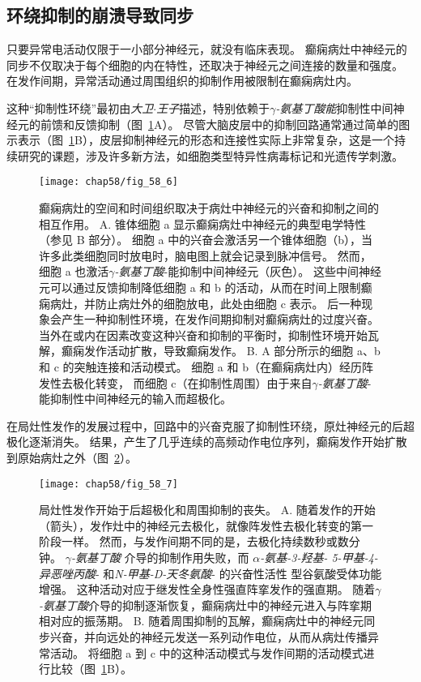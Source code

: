 \subsection{环绕抑制的崩溃导致同步}

只要异常电活动仅限于一小部分神经元，就没有临床表现。
癫痫病灶中神经元的同步不仅取决于每个细胞的内在特性，还取决于神经元之间连接的数量和强度。
在发作间期，异常活动通过周围组织的抑制作用被限制在癫痫病灶内。


这种“抑制性环绕”最初由\textit{大卫$\cdot$王子}描述，特别依赖于\textit{$\gamma$-氨基丁酸能}抑制性中间神经元的前馈和反馈抑制（图~\ref{fig:58_6}A）。
尽管大脑皮层中的抑制回路通常通过简单的图示表示（图~\ref{fig:58_6}B），皮层抑制神经元的形态和连接性实际上非常复杂，这是一个持续研究的课题，涉及许多新方法，如细胞类型特异性病毒标记和光遗传学刺激。


\begin{figure}[htbp]
	\centering
	\texttt{[image: chap58/fig\_58\_6]}
	\caption{癫痫病灶的空间和时间组织取决于病灶中神经元的兴奋和抑制之间的相互作用。
		A. 锥体细胞 a 显示癫痫病灶中神经元的典型电学特性（参见 B 部分）。
		细胞 a 中的兴奋会激活另一个锥体细胞（b），当许多此类细胞同时放电时，脑电图上就会记录到脉冲信号。
		然而，细胞 a 也激活\textit{$\gamma$-氨基丁酸}-能抑制中间神经元（灰色）。
		这些中间神经元可以通过反馈抑制降低细胞 a 和 b 的活动，从而在时间上限制癫痫病灶，并防止病灶外的细胞放电，此处由细胞 c 表示。
		后一种现象会产生一种抑制性环境，在发作间期抑制对癫痫病灶的过度兴奋。
		当外在或内在因素改变这种兴奋和抑制的平衡时，抑制性环境开始瓦解，癫痫发作活动扩散，导致癫痫发作\cite{lothman1990seizures}。
		B. A 部分所示的细胞 a、b 和 c 的突触连接和活动模式。
		细胞 a 和 b（在癫痫病灶内）经历阵发性去极化转变， 而细胞 c（在抑制性周围）由于来自\textit{$\gamma$-氨基丁酸}-能抑制性中间神经元的输入而超极化。}
	\label{fig:58_6}
\end{figure}


在局灶性发作的发展过程中，回路中的兴奋克服了抑制性环绕，原灶神经元的后超极化逐渐消失。
结果，产生了几乎连续的高频动作电位序列，癫痫发作开始扩散到原始病灶之外（图~\ref{fig:58_7}）。


\begin{figure}[htbp]
	\centering
	\texttt{[image: chap58/fig\_58\_7]}
	\caption{局灶性发作开始于后超极化和周围抑制的丧失\cite{lothman1993neurobiology}。
		A. 随着发作的开始（箭头），发作灶中的神经元去极化，就像阵发性去极化转变的第一阶段一样。
		然而，与发作间期不同的是，去极化持续数秒或数分钟。
		\textit{$\gamma$-氨基丁酸} 介导的抑制作用失败，而 \textit{$\alpha$-氨基-3-羟基- 5-甲基-4-异恶唑丙酸}- 和\textit{N-甲基-D-天冬氨酸}- 的兴奋性活性 型谷氨酸受体功能增强。
		这种活动对应于继发性全身性强直阵挛发作的强直期。
		随着\textit{$\gamma$-氨基丁酸}介导的抑制逐渐恢复，癫痫病灶中的神经元进入与阵挛期相对应的振荡期。
		B. 随着周围抑制的瓦解，癫痫病灶中的神经元同步兴奋，并向远处的神经元发送一系列动作电位，从而从病灶传播异常活动。
		将细胞 a 到 c 中的这种活动模式与发作间期的活动模式进行比较（图~\ref{fig:58_6}B）。}
	\label{fig:58_7}
\end{figure}


